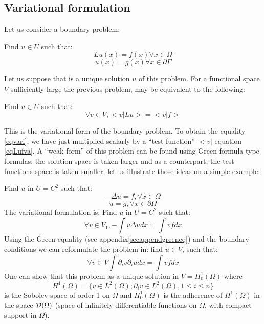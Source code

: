 \documentclass[12pt]{book}
\begin{document}
\subsection{Variational formulation}\label{secvafor}
Let us consider a boundary problem:
\begin{prob}
Find $u\in U$ such that:
\begin{equation}\label{eqLufva}
Lu(x)=f(x) \forall x \in\Omega
\end{equation}
\begin{equation}
u(x)=g(x) \forall x\in\partial\Gamma
\end{equation}
\end{prob}
Let us suppose that is a unique solution $u$ of this problem.
For a functional space $V$ sufficiently large the previous problem, may be
equivalent to the following:
\begin{prob}
Find $u\in U$ such that:
\begin{equation}\label{eqvari}
\forall v\in V, <v|Lu>=<v|f>
\end{equation}
\end{prob}
This is the variational form of the boundary problem. To obtain the equality
\ref{eqvari}, we have just multiplied scalarly by a ``test function'' $<v|$
equation \ref{eqLufva}. 
A ``weak form'' of this problem can be found using Green formula type
formulas: the solution space is taken larger and as a counterpart, the test
functions space is taken smaller. let us illustrate those ideas on a simple
example:
\begin{exmp}
Find $u$ in $U=C^2$ such that:
\begin{equation}
-\Delta u=f, \forall x\in \Omega
\end{equation}
\begin{equation}
u=g, \forall x\in\partial\Omega
\end{equation}
The variational formulation is:
Find $u$ in $U=C^2$ such that:
\begin{equation}
\forall v\in V_1, -\int v\Delta u dx=\int vf dx
\end{equation}
Using the Green equality (see
appendix\ref{secappendgreeneq}) and the
boundary conditions we can reformulate the problem in: 
find $u\in V$, such that:
\begin{equation}
\forall v\in V \int \partial_i v\partial_i u dx=\int vf dx
\end{equation}
One can show that this problem as a unique solution in $V=H^1_0(\Omega)$ where 
\begin{equation}
H^1(\Omega)=\{v\in L^2(\Omega);\partial_iv\in L^2(\Omega), 1\leq i\leq n\}
\end{equation}
is the Sobolev space of order 1 on $\Omega$ and $H_0^1(\Omega)$ is the
adherence of $H^1(\Omega)$ in the space ${\cal D}(\Omega)$ (space of
infinitely differentiable functions on $\Omega$, with compact support
in $\Omega$). 
\end{exmp}
\end{document}
